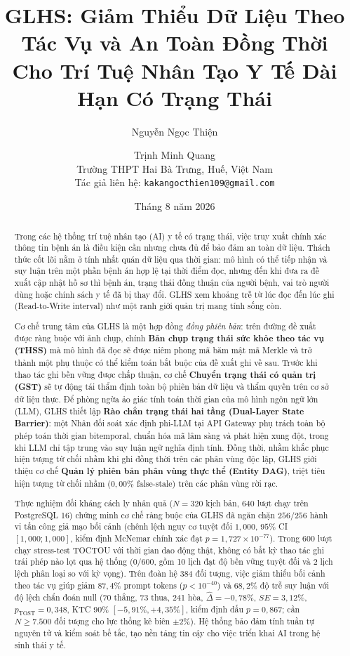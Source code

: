 \documentclass[11pt]{article}
\title{\textbf{GLHS: Giảm Thiểu Dữ Liệu Theo Tác Vụ và An Toàn Đồng Thời Cho Trí Tuệ Nhân Tạo Y Tế Dài Hạn Có Trạng Thái}}
\author{Nguyễn Ngọc Thiện \and Trịnh Minh Quang\\
Trường THPT Hai Bà Trưng, Huế, Việt Nam\\
Tác giả liên hệ: \texttt{kakangocthien109@gmail.com}}
\date{Tháng 8 năm 2026}
\begin{document}
\maketitle

\begin{abstract}
Trong các hệ thống trí tuệ nhân tạo (AI) y tế có trạng thái, việc truy xuất chính xác thông tin bệnh án là điều kiện cần nhưng chưa đủ để bảo đảm an toàn dữ liệu. Thách thức cốt lõi nằm ở tính nhất quán dữ liệu qua thời gian: mô hình có thể tiếp nhận và suy luận trên một phần bệnh án hợp lệ tại thời điểm đọc, nhưng đến khi đưa ra đề xuất cập nhật hồ sơ thì bệnh án, trạng thái đồng thuận của người bệnh, vai trò người dùng hoặc chính sách y tế đã bị thay đổi. GLHS xem khoảng trễ từ lúc đọc đến lúc ghi (Read-to-Write interval) như một ranh giới quản trị mang tính sống còn. 

Cơ chế trung tâm của GLHS là một hợp đồng \emph{đồng phiên bản}: trên đường đề xuất được ràng buộc với ảnh chụp, chính \textbf{Bản chụp trạng thái sức khỏe theo tác vụ (THSS)} mà mô hình đã đọc sẽ được niêm phong mã băm mật mã Merkle và trở thành một phụ thuộc có thể kiểm toán bắt buộc của đề xuất ghi về sau. Trước khi thao tác ghi bền vững được chấp thuận, cơ chế \textbf{Chuyển trạng thái có quản trị (GST)} sẽ tự động tái thẩm định toàn bộ phiên bản dữ liệu và thẩm quyền trên cơ sở dữ liệu thực. Để phòng ngừa ảo giác tính toán thời gian của mô hình ngôn ngữ lớn (LLM), GLHS thiết lập \textbf{Rào chắn trạng thái hai tầng (Dual-Layer State Barrier)}: một Nhân đối soát xác định phi-LLM tại API Gateway phụ trách toàn bộ phép toán thời gian bitemporal, chuẩn hóa mã lâm sàng và phát hiện xung đột, trong khi LLM chỉ tập trung vào suy luận ngữ nghĩa định tính. Đồng thời, nhằm khắc phục hiện tượng từ chối nhầm khi ghi đồng thời trên các phân vùng độc lập, GLHS giới thiệu cơ chế \textbf{Quản lý phiên bản phân vùng thực thể (Entity DAG)}, triệt tiêu hiện tượng từ chối nhầm ($0{,}00\%$ false-stale) trên các phân vùng rời rạc.

Thực nghiệm đối kháng cách ly nhân quả ($N=320$ kịch bản, 640 lượt chạy trên PostgreSQL 16) chứng minh cơ chế ràng buộc của GLHS đã ngăn chặn $256/256$ hành vi tấn công giả mạo bối cảnh (chênh lệch nguy cơ tuyệt đối $1{,}000$, $95\%$ CI $[1{,}000; 1{,}000]$, kiểm định McNemar chính xác đạt $p = 1{,}727 \times 10^{-77}$). Trong 600 lượt chạy stress-test TOCTOU với thời gian dao động thật, không có bất kỳ thao tác ghi trái phép nào lọt qua hệ thống ($0/600$, gồm 10 lịch đạt độ bền vững tuyệt đối và 2 lịch lệch phân loại so với kỳ vọng). Trên đoàn hệ 384 đối tượng, việc giảm thiểu bối cảnh theo tác vụ giúp giảm $87{,}4\%$ prompt tokens ($p < 10^{-40}$) và $68{,}2\%$ độ trễ suy luận với độ lệch chẩn đoán null (70 thắng, 73 thua, 241 hòa, $\hat{\Delta} = -0{,}78\%$, $SE = 3{,}12\%$, $p_{\text{TOST}} = 0{,}348$, KTC 90\% $[-5{,}91\%, +4{,}35\%]$, kiểm định dấu $p = 0{,}867$; cần $N \ge 7.500$ đối tượng cho lực thống kê biên $\pm 2\%$). Hệ thống bảo đảm tính tuần tự nguyên tử và kiểm soát bế tắc, tạo nền tảng tin cậy cho việc triển khai AI trong hệ sinh thái y tế.
\end{abstract}
\end{document}
